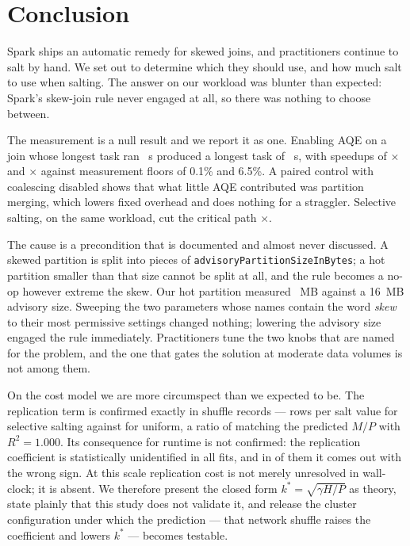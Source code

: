\section{Conclusion}
\label{sec:conclusion}

Spark ships an automatic remedy for skewed joins, and practitioners continue to
salt by hand. We set out to determine which they should use, and how much salt
to use when salting. The answer on our workload was blunter than expected:
Spark's skew-join rule never engaged at all, so there was nothing to choose
between.

The measurement is a null result and we report it as one. Enabling AQE on a
join whose longest task ran \BaseMaxTaskThick~s produced a longest task of
\AqeCoalMaxTaskThick~s, with speedups of \AqeSpeedupMid$\times$ and
\AqeSpeedupThick$\times$ against measurement floors of 0.1\% and 6.5\%. A
paired control with coalescing disabled shows that what little AQE contributed
was partition merging, which lowers fixed overhead and does nothing for a
straggler. Selective salting, on the same workload, cut the critical path
\SaltTaskCutThick$\times$.

The cause is a precondition that is documented and almost never discussed. A
skewed partition is split into pieces of \texttt{advisoryPartitionSizeInBytes};
a hot partition smaller than that size cannot be split at all, and the rule
becomes a no-op however extreme the skew. Our hot partition measured
\MeasHotMB~MB against a 16~MB advisory size. Sweeping the two parameters whose
names contain the word \emph{skew} to their most permissive settings changed
nothing; lowering the advisory size engaged the rule immediately. Practitioners
tune the two knobs that are named for the problem, and the one that gates the
solution at moderate data volumes is not among them.

On the cost model we are more circumspect than we expected to be. The
replication term is confirmed exactly in shuffle records --- \SelRecSlope{}
rows per salt value for selective salting against \UnifRecSlope{} for uniform,
a ratio of \RecSlopeRatio{} matching the predicted $M/P$ with $R^{2}=1.000$.
Its consequence for runtime is not confirmed: the replication coefficient is
statistically unidentified in all \NumFits{} fits, and in \NumNegativeB{} of
them it comes out with the wrong sign. At this scale replication cost is not
merely unresolved in wall-clock; it is absent. We therefore present the closed
form $k^{*}=\sqrt{\gamma H/P}$ as theory, state plainly that this study does
not validate it, and release the cluster configuration under which the
prediction --- that network shuffle raises the coefficient and lowers $k^{*}$
--- becomes testable.

